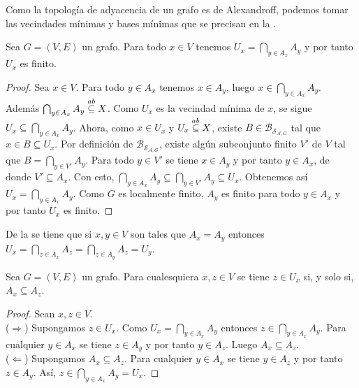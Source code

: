 Como la topología de adyacencia de un grafo es de Alexandroff, podemos tomar las vecindades mínimas y bases mínimas que se precisan en la .
\begin{Prop}\label{Prop:U_x_2}
   Sea $G=(V,E)$ un grafo. Para todo $x\in V$ tenemos $U_x=\bigcap_{y\in A_x}A_y$ y por tanto $U_x$ es finito.
\end{Prop}
\begin{proof}
   Sea $x\in V$. Para todo $y\in A_x$ tenemos $x\in A_y$, luego $x\in\bigcap_{y\in A_x}A_y$. Además $\bigcap_{y\in A_x}A_y\stackrel{ab}{\subseteq} X$. Como $U_x$ es la vecindad mínima de $x$, se sigue $U_x\subseteq \bigcap_{y\in A_x}A_y$. Ahora, como $x\in U_x$ y $U_x\stackrel{ab}{\subseteq} X$, existe $B\in\mathcal{B}_{\mathcal{S}_{\mathcal{A},G}}$ tal que $x\in B \subseteq U_x$. Por definición de $\mathcal{B}_{\mathcal{S}_{\mathcal{A},G}}$, existe algún subconjunto finito $V'$ de $V$ tal que $B=\bigcap_{y\in V'}A_y$. Para todo $y\in V'$ se tiene $x\in A_y$ y por tanto $y\in A_x$, de donde $V'\subseteq A_x$. Con esto, $\bigcap_{y\in A_x}A_y\subseteq\bigcap_{y\in V'}A_y \subseteq U_x$. Obtenemos así $U_x=\bigcap_{y\in A_x}A_y$. Como $G$ es localmente finito, $A_y$ es finito para todo $y\in A_x$ y por tanto $U_x$ es finito.
\end{proof}
\begin{Obs}\label{Obs:Igualdad_adyacencias_vecindades}
   De la  se tiene que si $x,y\in V$ son tales que $A_x=A_y$ entonces $U_x=\bigcap_{z\in A_x}A_z=\bigcap_{z\in A_y}A_z=U_y$.
\end{Obs}
\begin{Cor}\label{Cor:U_x_contenencia}
    Sea $G=(V,E)$ un grafo. Para cualesquiera $x,z\in V$ se tiene $z\in U_x$ si, y solo si, $A_x\subseteq A_z$.
\end{Cor}
\begin{proof}
   Sean $x,z\in V$.\\
   ($\Rightarrow$) Supongamos $z\in U_x$. Como $U_x=\bigcap_{y\in A_x}A_y$ entonces $z\in \bigcap_{y\in A_x}A_y$. Para cualquier $y\in A_x$ se tiene $z\in A_y$ y por tanto $y\in A_z$. Luego $A_x\subseteq A_z$.\\
   ($\Leftarrow$) Supongamos $A_x\subseteq A_z$. Para cualquier $y\in A_x$ se tiene $y\in A_z$ y por tanto $z\in A_y$. Así, $z\in \bigcap_{y\in A_x}A_y=U_x$.
\end{proof}
